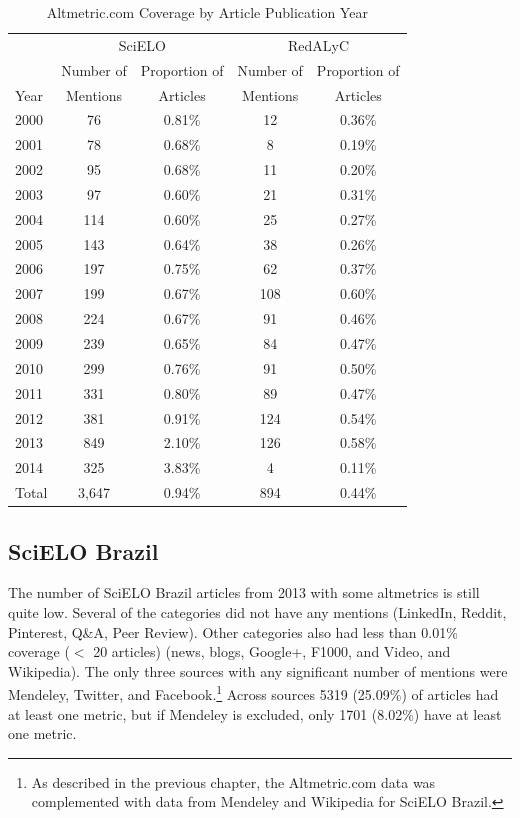 \begin{table}[!htbp]
\centering
\caption{Altmetric.com Coverage by Article Publication Year} \label{altmetrics_coverage_by_year_both}
\begin{tabular}{@{}lcccc@{}}
\toprule
    &\multicolumn{2}{c}{SciELO} &\multicolumn{2}{c}{RedALyC}  \\ \cmidrule(l{2pt}r{2pt}){2-3} \cmidrule(l{2pt}r{2pt}){4-5}
    &   Number of&  Proportion of   & Number of &   Proportion of \\
Year    &   Mentions    & Articles  & Mentions &    Articles \\ \midrule
2000    &   76  &   0.81\%  &   12  &   0.36\%  \\
2001    &   78  &   0.68\%  &   8   &   0.19\%  \\
2002    &   95  &   0.68\%  &   11  &   0.20\%  \\
2003    &   97  &   0.60\%  &   21  &   0.31\%  \\
2004    &   114 &   0.60\%  &   25  &   0.27\%  \\
2005    &   143 &   0.64\%  &   38  &   0.26\%  \\
2006    &   197 &   0.75\%  &   62  &   0.37\%  \\
2007    &   199 &   0.67\%  &   108 &   0.60\%  \\
2008    &   224 &   0.67\%  &   91  &   0.46\%  \\
2009    &   239 &   0.65\%  &   84  &   0.47\%  \\
2010    &   299 &   0.76\%  &   91  &   0.50\%  \\
2011    &   331 &   0.80\%  &   89  &   0.47\%  \\
2012    &   381 &   0.91\%  &   124 &   0.54\%  \\
2013    &   849 &   2.10\%  &   126 &   0.58\%  \\ \midrule
2014    &   325 &   3.83\%  &   4   &   0.11\%  \\ \midrule
Total   &   3,647   &   0.94\%  &   894 &   0.44\%  \\ \bottomrule
\end{tabular}
\end{table}




\subsection{SciELO Brazil}
\label{scielobrazil}

The number of SciELO Brazil articles from 2013 with some altmetrics is still quite low. Several of the categories did not have any mentions (LinkedIn, Reddit, Pinterest, Q\&A, Peer Review). Other categories also had less than 0.01\% coverage ($<$ 20 articles) (news, blogs, Google+, F1000, and Video, and Wikipedia). The only three sources with any significant number of mentions were Mendeley, Twitter, and Facebook.\footnote{As described in the previous chapter, the Altmetric.com data was complemented with data from Mendeley and Wikipedia for SciELO Brazil.} Across sources 5319 (25.09\%) of articles had at least one metric, but if Mendeley is excluded, only 1701 (8.02\%) have at least one metric.

